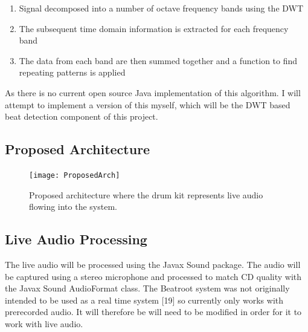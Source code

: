 \documentclass[a4paper, 11pt]{article}
\begin{document}
\begin{enumerate}
\item Signal decomposed into a number of octave frequency bands using the DWT
\item The subsequent time domain information is extracted for each frequency band
\item The data from each band are then summed together and a function to find repeating patterns is applied
\end{enumerate}

As there is no current open source Java implementation of this algorithm. I will attempt to implement a version of this myself, which will be the DWT based beat detection component of this project.





\subsection{Proposed Architecture}

\begin{figure}[h]
	\centering
	\texttt{[image: ProposedArch]}
	\caption{Proposed architecture where the drum kit represents live audio flowing into the system.}
\end{figure}


\subsection{Live Audio Processing}
The live audio will be processed using the Javax Sound package. The audio will be captured using a stereo microphone and processed to match CD quality with the Javax Sound AudioFormat class. The Beatroot system was not originally intended to be used as a real time system [19] so currently only works with prerecorded audio. It will therefore be will need to be modified in order for it to work with live audio. 
\end{document}
